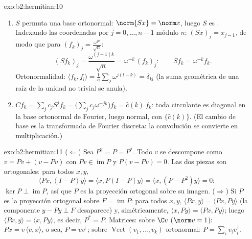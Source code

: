 \begin{solution}{exo:b2:hermitian:10}
\begin{enumerate}
  \item $S$ permuta una base ortonormal: $\norm{Sx} = \norm x$,
        luego $S$ es . Indexando las coordenadas por $j =
        0, \dots, n-1$ módulo $n$: $(Sx)_j = x_{j-1}$, de modo que
        para $(f_k)_j = \frac{\omega^{jk}}{\sqrt n}$:
        \[
        (Sf_k)_j = \frac{\omega^{(j-1)k}}{\sqrt n}
        = \omega^{-k}\,(f_k)_j :
        \qquad Sf_k = \omega^{-k}f_k .
        \]
        Ortonormalidad: $\langle f_k, f_l\rangle = \frac1n \sum_j
        \omega^{j(l-k)} = \delta_{kl}$ (la suma geométrica de una
        raíz de la unidad no trivial se anula).
  \item $Cf_k = \sum_j c_j S^jf_k = \bigl(\sum_j
        c_j\omega^{-jk}\bigr)f_k = \widehat c(k)\,f_k$: toda
        circulante es diagonal en la base ortonormal de Fourier,
        luego normal, con  $\{\widehat c(k)\}$. (El cambio
        de base es la transformada de Fourier discreta: la
        convolución se convierte en multiplicación.)
\end{enumerate}
\end{solution}

\begin{solution}{exo:b2:hermitian:11}
($\Leftarrow$) Sea $P^2 = P = P^*$. Todo $v$ se descompone como $v =
Pv + (v - Pv)$ con $Pv \in \operatorname{im} P$ y $P(v - Pv) = 0$.
Las dos piezas son ortogonales: para todos $x, y$,
\[
\langle Px, (I - P)y\rangle = \langle x, P(I-P)y\rangle
= \langle x, (P - P^2)y\rangle = 0 :
\]
$\ker P \perp \operatorname{im} P$, así que $P$ es la proyección
ortogonal sobre su imagen. ($\Rightarrow$) Si $P$ es la proyección
ortogonal sobre $F = \operatorname{im}P$: para todos $x, y$, $\langle
Px, y\rangle = \langle Px, Py\rangle$ (la componente $y - Py \perp F$
desaparece) y, simétricamente, $\langle x, Py\rangle = \langle Px,
Py\rangle$; luego $\langle Px, y\rangle = \langle x, Py\rangle$, es
decir, $P^* = P$. Matrices: sobre $\C v$ ($\norm v = 1$): $Px =
v\,\langle v, x\rangle$, o sea, $P = vv^\dagger$; sobre
$\operatorname{Vect}(v_1, \dots, v_k)$ ortonormal: $P = \sum_i
v_iv_i^\dagger$.
\end{solution}


